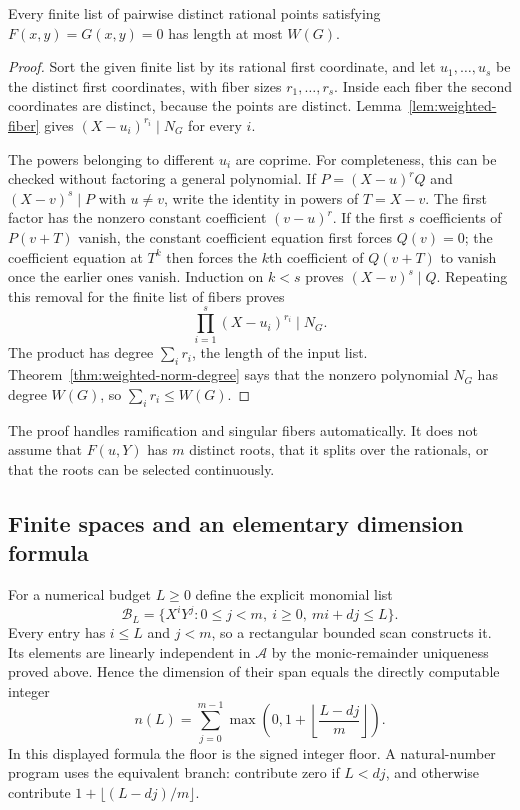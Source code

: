 \begin{theorem}\label{thm:weighted-zero-count}
Every finite list of pairwise distinct rational points satisfying
$F(x,y)=G(x,y)=0$ has length at most $W(G)$.
\end{theorem}

\begin{proof}
Sort the given finite list by its rational first coordinate, and let
$u_1,\ldots,u_s$ be the distinct first coordinates, with fiber sizes
$r_1,\ldots,r_s$.  Inside each fiber the second coordinates are distinct,
because the points are distinct.  Lemma~\ref{lem:weighted-fiber} gives
$(X-u_i)^{r_i}\mid N_G$ for every $i$.

The powers belonging to different $u_i$ are coprime.  For completeness,
this can be checked without factoring a general polynomial.  If
$P=(X-u)^r Q$ and $(X-v)^s\mid P$ with $u\ne v$, write the identity
in powers of $T=X-v$.  The first factor has the nonzero constant
coefficient $(v-u)^r$.  If the first $s$ coefficients of $P(v+T)$
vanish, the constant coefficient equation first forces $Q(v)=0$;
the coefficient equation at $T^k$ then forces the $k$th coefficient
of $Q(v+T)$ to vanish once the earlier ones vanish.  Induction on
$k<s$ proves $(X-v)^s\mid Q$.  Repeating this removal for the finite
list of fibers proves
\[
 \prod_{i=1}^s(X-u_i)^{r_i}\mid N_G.
\]
The product has degree $\sum_i r_i$, the length of the input list.
Theorem~\ref{thm:weighted-norm-degree} says that the nonzero polynomial
$N_G$ has degree $W(G)$, so $\sum_i r_i\le W(G)$.
\end{proof}

The proof handles ramification and singular fibers automatically.  It does
not assume that $F(u,Y)$ has $m$ distinct roots, that it splits over the
rationals, or that the roots can be selected continuously.

\subsection{Finite spaces and an elementary dimension formula}

For a numerical budget $L\ge0$ define the explicit monomial list
\[
 \mathcal B_L=\{X^iY^j:0\le j<m,\ i\ge0,\ mi+dj\le L\}.
\]
Every entry has $i\le L$ and $j<m$, so a rectangular bounded scan
constructs it.  Its elements are linearly independent in $\mathcal A$
by the monic-remainder uniqueness proved above.  Hence the dimension of
their span equals the directly computable integer
\begin{equation}\label{eq:weighted-dimension}
 n(L)=\sum_{j=0}^{m-1}
       \max\left(0,1+\left\lfloor\frac{L-dj}{m}\right\rfloor\right).
\end{equation}
In this displayed formula the floor is the signed integer floor.  A
natural-number program uses the equivalent branch: contribute zero if
$L<dj$, and otherwise contribute $1+\lfloor(L-dj)/m\rfloor$.

